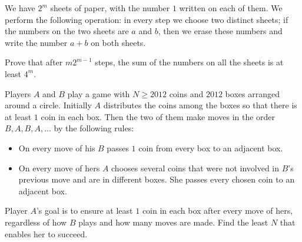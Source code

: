 



\renewcommand{\theenumi}{\alph{enumi}}



\noindent
 
\filbreak


\begin{problem}

We have $2^m$ sheets of paper, with the number $1$ written on each of them. We perform
the following operation: in every step we choose two distinct sheets; if the numbers on the two
sheets are $a$ and $b$, then we erase these numbers and write the number $a +  b$ on both sheets.

Prove that after $m2^{m-1}$ steps, the sum of the numbers on all the sheets is at least $4^m$.

\end{problem}

\begin{problem}

Players $A$ and $B$ play a game with $N \ge 2012$ coins and $2012$ boxes arranged around a circle. 
Initially $A$ distributes the coins among the boxes so that there is at least $1$ coin in each box. 
Then the two of them make moves in the order $B, A, B, A, \dots$ by the following rules:
\begin{itemize}
\item On every move of his $B$ passes $1$ coin from every box to an adjacent box.
\item On every move of hers $A$ chooses several coins that were not involved in $B$’s previous move and are in different boxes. She passes every chosen coin to an adjacent box.
\end{itemize}

Player $A$’s goal is to ensure at least $1$ coin in each box after every move of hers, regardless of how $B$ plays and how many moves are made. Find the least $N$ that enables her to succeed.


\end{problem}



